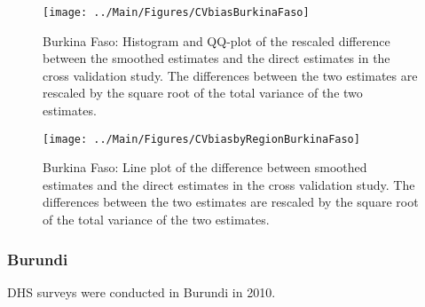 \documentclass[12pt]{article}\usepackage[]{graphicx}\usepackage[]{color}
\newenvironment{knitrout}{}{} %
\begin{document}
\begin{knitrout}
\color{fgcolor}\begin{figure}[bht]

{\centering \texttt{[image: ../Main/Figures/CVbiasBurkinaFaso]} 

}

\caption[Burkina Faso]{Burkina Faso: Histogram and QQ-plot of the rescaled difference between the smoothed estimates and the direct estimates in the cross validation study. The differences between the two estimates are rescaled by the square root of the total variance of the two estimates.}\label{fig:unnamed-chunk-29}
\end{figure}


\end{knitrout}

\begin{knitrout}
\color{fgcolor}\begin{figure}[bht]

{\centering \texttt{[image: ../Main/Figures/CVbiasbyRegionBurkinaFaso]} 

}

\caption[Burkina Faso]{Burkina Faso: Line plot of the difference between smoothed estimates and the direct estimates in the cross validation study. The differences between the two estimates are rescaled by the square root of the total variance of the two estimates.}\label{fig:unnamed-chunk-30}
\end{figure}


\end{knitrout}

\clearpage
\subsubsection{Burundi}





DHS surveys were conducted in Burundi in 2010.
\end{document}
